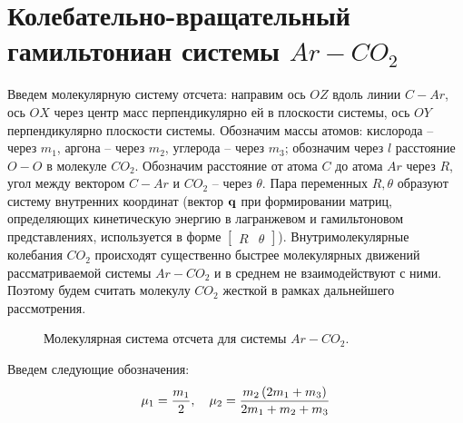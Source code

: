\section{Колебательно-вращательный гамильтониан системы $Ar-CO_2$}

Введем молекулярную систему отсчета: направим ось $OZ$ вдоль линии $C-Ar$, ось $OX$ через центр масс перпендикулярно ей в плоскости системы, ось $OY$ перпендикулярно плоскости системы. Обозначим массы атомов: кислорода -- через $m_1$, аргона -- через $m_2$, углерода -- через $m_3$; обозначим через $l$ расстояние $O-O$ в молекуле $CO_2$. Обозначим расстояние от атома $C$ до атома $Ar$ через $R$, угол между вектором $C-Ar$ и $CO_2$ -- через $\theta$. Пара переменных $R, \theta$ образуют систему внутренних координат (вектор $\mathbf{q}$ при формировании матриц, определяющих кинетическую энергию в лагранжевом и гамильтоновом представлениях, используется в форме $\begin{bmatrix} R & \theta \end{bmatrix}$). Внутримолекулярные колебания $CO_2$ происходят существенно быстрее молекулярных движений рассматриваемой системы $Ar-CO_2$ и в среднем не взаимодействуют с ними. Поэтому будем считать молекулу $CO_2$ жесткой в рамках дальнейшего рассмотрения.  
\begin{figure}[h]
\centering
{}
\caption{Молекулярная система отсчета для системы $Ar-CO_2$.}
\end{figure}

Введем следующие обозначения:
\vverh
\begin{gather}
	\mu_1 = \frac{m_1}{2}, \quad 
	\mu_2 = \frac{m_2 \left( 2 m_1 + m_3 \right)}{2 m_1 + m_2 + m_3} \notag
\end{gather}

